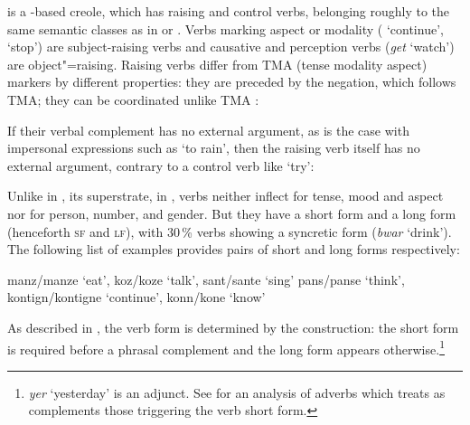  is a -based creole, which has raising and control verbs, belonging
roughly to the same semantic classes as in  or . Verbs marking aspect or
modality ( `continue',  `stop') are subject-raising verbs and causative and
perception verbs (\emph{get} `watch') are object"=raising. Raising verbs differ from TMA (tense
modality aspect) markers by different properties: they are preceded by the negation, which follows
TMA; they can be coordinated unlike TMA \citep[]{HenriandLaurens2011}:

\eal
{}
\zl
 
If their verbal complement has no external argument, as is the case with impersonal expressions such as  `to rain', then the raising verb itself has no external argument, contrary to a control verb like  `try':

\eal
{}
\zl

Unlike in , its superstrate, in ,  verbs neither inflect for tense, mood and aspect nor for person, number, and
gender. But they have a short form and a long form (henceforth \textsc{sf} and \textsc{lf}), with
30\,\% verbs showing a syncretic form (\emph{bwar} `drink'). The following list of examples provides pairs of short and
long forms respectively:

\eal
\ex manz/manze `eat', koz/koze `talk', sant/sante `sing'
\ex pans/panse `think', kontign/kontigne `continue', konn/kone `know'
\zl

As described in \citet{Henri2010}, the verb form is determined by the construction: the short form is required before a phrasal complement and the long form appears otherwise.\footnote{\textit{yer} `yesterday' is an adjunct. See  for an analysis of  adverbs which treats as complements those triggering the verb short form.}


